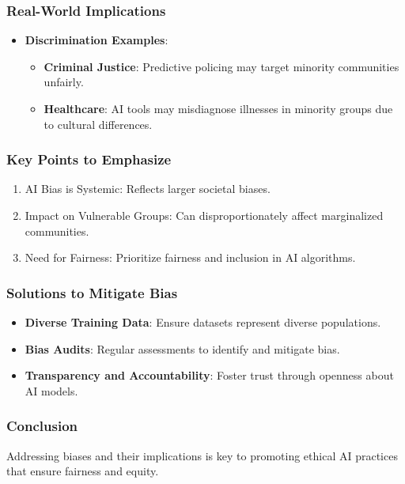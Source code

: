 \documentclass[aspectratio=169]{beamer}
\begin{document}
\begin{frame}[fragile]
    \frametitle{Real-World Implications}
    \begin{itemize}
        \item \textbf{Discrimination Examples}:
            \begin{itemize}
                \item \textbf{Criminal Justice}: Predictive policing may target minority communities unfairly.
                \item \textbf{Healthcare}: AI tools may misdiagnose illnesses in minority groups due to cultural differences.
            \end{itemize}
    \end{itemize}
\end{frame}

\begin{frame}[fragile]
    \frametitle{Key Points to Emphasize}
    \begin{enumerate}
        \item AI Bias is Systemic: Reflects larger societal biases.
        \item Impact on Vulnerable Groups: Can disproportionately affect marginalized communities.
        \item Need for Fairness: Prioritize fairness and inclusion in AI algorithms.
    \end{enumerate}
\end{frame}

\begin{frame}[fragile]
    \frametitle{Solutions to Mitigate Bias}
    \begin{itemize}
        \item \textbf{Diverse Training Data}: Ensure datasets represent diverse populations.
        \item \textbf{Bias Audits}: Regular assessments to identify and mitigate bias.
        \item \textbf{Transparency and Accountability}: Foster trust through openness about AI models.
    \end{itemize}
\end{frame}

\begin{frame}[fragile]
    \frametitle{Conclusion}
    \begin{block}{}
        Addressing biases and their implications is key to promoting ethical AI practices that ensure fairness and equity.
    \end{block}
\end{frame}
\end{document}
